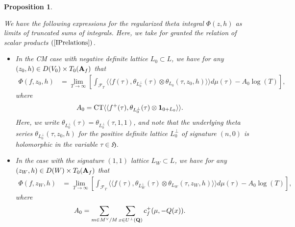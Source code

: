\documentclass{amsart}
\newtheorem{proposition}[theorem]{Proposition}
\theoremstyle{definition}
\theoremstyle{definition}
\theoremstyle{definition}
\begin{document}
\begin{proposition}\label{kudla}

We have the following expressions for the regularized theta integral $\Phi(z, h)$ as limits of truncated sums of integrals. 
Here, we take for granted the relation of scalar products $(\ref{IPrelations})$.\\

\begin{itemize}

\item[(i)] In the CM case with negative definite lattice $L_0 \subset L$, we have for any $(z_0, h) \in D(V_0) \times T_0({\bf{A}}_f)$ that  
\begin{align*} \Phi(f, z_0, h) &= \lim_{T \rightarrow \infty} \left[ \int_{\mathcal{F}_T} \langle \langle f(\tau), 
\theta_{L_0^{\perp}}(\tau) \otimes \theta_{L_0}(\tau, z_0, h) \rangle \rangle d \mu(\tau) - A_0 \log(T) \right], \end{align*} where 
\begin{align*} A_0 &= \operatorname{CT} \langle \langle f ^+(\tau), 
\theta_{L_0^{\perp}}(\tau) \otimes {\bf{1}}_{0 + L_0} \rangle \rangle.\end{align*}
Here, we write $\theta_{L_0^{\perp}}(\tau) = \theta_{L_0^{\perp}}(\tau, 1, 1)$, and note that the underlying theta
series $\theta_{L_0^{\perp}}(\tau, z_0, h)$ for the positive definite lattice $L_0^{\perp}$ of signature $(n, 0)$ is holomorphic in the variable $\tau \in \mathfrak{H}$. \\

\item[(ii)] In the case with the signature $(1,1)$ lattice $L_W \subset L$, we have for any $(z_W, h) \in D(W) \times T_0({\bf{A}}_f)$ that  
\begin{align*} \Phi(f, z_W, h) &= \lim_{T \rightarrow \infty} \left[ \int_{\mathcal{F}_T} \langle \langle f(\tau), 
\theta_{L_W^{\perp}}(\tau) \otimes \theta_{L_W}(\tau, z_W, h) \rangle \rangle d \mu(\tau) - A_0 \log(T) \right], \end{align*} where 
\begin{align*} A_0 &=\sum\limits_{m \in M^{\vee}/M} \sum\limits_{x \in U^{\perp}({\bf{Q}})} c_{f}^+(\mu, -Q(x)) .\end{align*} \end{itemize}

\end{proposition}
\end{document}
